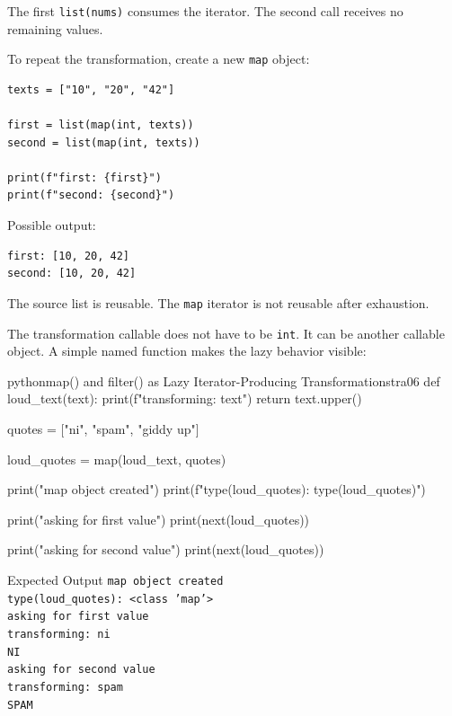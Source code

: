 The first \texttt{list(nums)} consumes the iterator. The second call receives no remaining values.

To repeat the transformation, create a new \texttt{map} object:

\begin{verbatim}
texts = ["10", "20", "42"]

first = list(map(int, texts))
second = list(map(int, texts))

print(f"first: {first}")
print(f"second: {second}")
\end{verbatim}

Possible output:

\begin{verbatim}
first: [10, 20, 42]
second: [10, 20, 42]
\end{verbatim}

The source list is reusable. The \texttt{map} iterator is not reusable after exhaustion.

The transformation callable does not have to be \texttt{int}. It can be another callable object. A simple named function makes the lazy behavior visible:

\begin{codebox}[]{python}{map() and filter() as Lazy Iterator-Producing Transformations}{tra06}
def loud_text(text):
    print(f"transforming: {text}")
    return text.upper()

quotes = ["ni", "spam", "giddy up"]

loud_quotes = map(loud_text, quotes)

print("map object created")
print(f"type(loud_quotes): {type(loud_quotes)}")

print("asking for first value")
print(next(loud_quotes))

print("asking for second value")
print(next(loud_quotes))
\end{codebox}


\begin{iobox}{Expected Output}
\texttt{map object created} \\
\texttt{type(loud\_quotes): <class 'map'>} \\
\texttt{asking for first value} \\
\texttt{transforming: ni} \\
\texttt{NI} \\
\texttt{asking for second value} \\
\texttt{transforming: spam} \\
\texttt{SPAM} \\
\end{iobox}




